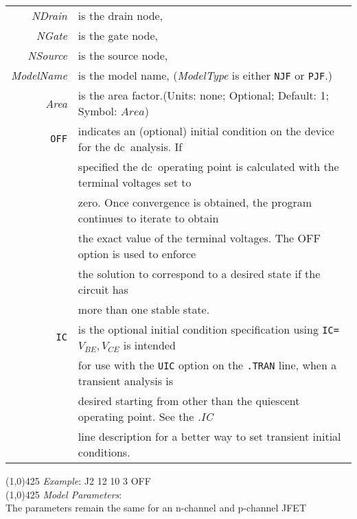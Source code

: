 \begin{tabular}{r l}
{\it NDrain} & is the drain node, \\
{\it NGate} & is the gate node, \\
{\it NSource} & is the source node, \\
{\it ModelName} & is the model name, (\textit{ModelType} is either \texttt{NJF} or \texttt{PJF}.) \\
{\it Area} & is  the  area  factor.(Units: none; Optional; Default: 1; Symbol: $Area$) \\
{\tt OFF} & indicates an (optional) initial condition on the device for the dc\ analysis. If \\
& specified the dc\ operating point is calculated with the terminal voltages set to \\
& zero. Once convergence is obtained, the program continues to iterate to obtain \\
& the exact value of the  terminal  voltages.  The OFF option is used to enforce \\
& the solution to  correspond to  a  desired state if the circuit has \\
& more than one stable state. \\
{\tt IC} & is the optional initial condition specification using  {\tt IC=}$V_{BE},V_{CE}$ is  intended \\
& for use with the {\tt UIC} option on the {\tt .TRAN} line, when a transient analysis is \\
& desired  starting  from  other than  the  quiescent  operating  point. See  the {\it .IC} \\
& line description for a better way to set transient initial
conditions.
\end{tabular}
\newline
\linethickness{0.5mm} \line(1,0){425}
\newline
\noindent\textit{Example}:
\newline
J2 12 10 3 OFF \\
\linethickness{0.5mm} \line(1,0){425}
\newline
\noindent\textit{Model Parameters}:\\[0.1in]
The parameters remain the same for an n-channel and p-channel JFET
\newline
